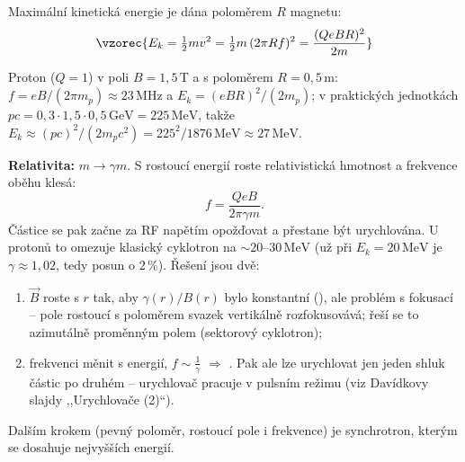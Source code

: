 Maximální kinetická energie je dána poloměrem \(R\) magnetu:
\[
  \vzorec{E_k = \tfrac12 mv^2 = \tfrac12 m\,(2\pi R f)^2 = \frac{(QeBR)^2}{2m}}
\]

\begin{priklad}[Odhad]
  Proton (\(Q=1\)) v poli \(B=1{,}5\,\mathrm{T}\) a s poloměrem \(R=0{,}5\,\mathrm{m}\):
  \(f = eB/(2\pi m_p) \approx 23\,\mathrm{MHz}\) a \(E_k = (eBR)^2/(2m_p)\); v praktických
  jednotkách \(pc = 0{,}3\cdot1{,}5\cdot0{,}5\,\mathrm{GeV}=225\,\mathrm{MeV}\), takže
  \(E_k\approx (pc)^2/(2m_pc^2) = 225^2/1876\,\mathrm{MeV}\approx 27\,\mathrm{MeV}\).
\end{priklad}

\textbf{Relativita:} \(m\to\gamma m\). S rostoucí energií roste relativistická hmotnost a
frekvence oběhu klesá:
\[
  f = \frac{QeB}{2\pi\gamma m} .
\]
Částice se pak začne za RF napětím opožďovat a přestane být urychlována. U protonů to omezuje
klasický cyklotron na \(\sim 20\)--\(30\,\mathrm{MeV}\) (už při \(E_k = 20\,\mathrm{MeV}\) je
\(\gamma\approx1{,}02\), tedy posun o \(2\,\%\)). Řešení jsou dvě:
\begin{enumerate}[label=\alph*)]
  \item \(\vec B\) roste s \(r\) tak, aby \(\gamma(r)/B(r)\) bylo konstantní (), ale problém s fokusací -- pole rostoucí s poloměrem svazek vertikálně
        rozfokusovává; řeší se to azimutálně proměnným polem (sektorový cyklotron);
  \item frekvenci měnit s energií, \(f\sim\frac1\gamma\) \(\Rightarrow\) .
        Pak ale lze urychlovat jen jeden shluk částic po druhém -- urychlovač pracuje
        v pulsním režimu (viz Davídkovy slajdy ,,Urychlovače (2)``).
\end{enumerate}
Dalším krokem (pevný poloměr, rostoucí pole i frekvence) je synchrotron, kterým se dosahuje
nejvyšších energií.
